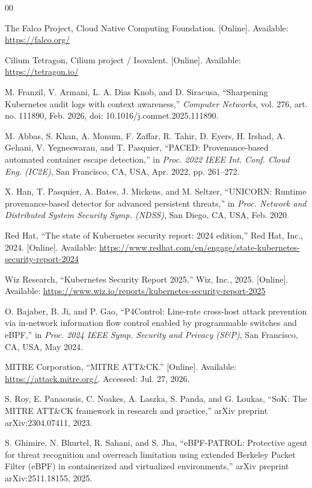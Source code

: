 \documentclass{ieeeaccess}
\begin{document}
\begin{thebibliography}{00}

 The Falco Project, Cloud Native Computing Foundation. [Online]. Available: \url{https://falco.org/}

 Cilium Tetragon, Cilium project / Isovalent. [Online]. Available: \url{https://tetragon.io/}

 M. Franzil, V. Armani, L. A. Dias Knob, and D. Siracusa, ``Sharpening
Kubernetes audit logs with context awareness,'' \emph{Computer Networks}, vol.
276, art. no. 111890, Feb. 2026, doi: 10.1016/j.comnet.2025.111890.

 M. Abbas, S. Khan, A. Monum, F. Zaffar, R. Tahir, D. Eyers, H.
Irshad, A. Gehani, V. Yegneswaran, and T. Pasquier, ``PACED:
Provenance-based automated container escape detection,'' in \emph{Proc. 2022
IEEE Int. Conf. Cloud Eng. (IC2E)}, San Francisco, CA, USA, Apr. 2022,
pp. 261--272.

 X. Han, T. Pasquier, A. Bates, J. Mickens, and M. Seltzer, ``UNICORN:
Runtime provenance-based detector for advanced persistent threats,'' in
\emph{Proc. Network and Distributed System Security Symp. (NDSS)}, San Diego,
CA, USA, Feb. 2020.

 Red Hat, ``The state of Kubernetes security report: 2024 edition,''
Red Hat, Inc., 2024. [Online]. Available: \url{https://www.redhat.com/en/engage/state-kubernetes-security-report-2024}

 Wiz Research, ``Kubernetes Security Report 2025,'' Wiz, Inc., 2025.
[Online]. Available: \url{https://www.wiz.io/reports/kubernetes-security-report-2025}

 O. Bajaber, B. Ji, and P. Gao, ``P4Control: Line-rate cross-host
attack prevention via in-network information flow control enabled by
programmable switches and eBPF,'' in \emph{Proc. 2024 IEEE Symp. Security and
Privacy (S\&P)}, San Francisco, CA, USA, May 2024.

 MITRE Corporation, ``MITRE ATT\&CK.'' [Online]. Available:
\url{https://attack.mitre.org/}. Accessed: Jul. 27, 2026.

 S. Roy, E. Panaousis, C. Noakes, A. Laszka, S. Panda, and G.
Loukas, ``SoK: The MITRE ATT\&CK framework in research and practice,''
arXiv preprint arXiv:2304.07411, 2023.

 S. Ghimire, N. Bhurtel, R. Sahani, and S. Jha, ``eBPF-PATROL:
Protective agent for threat recognition and overreach limitation using
extended Berkeley Packet Filter (eBPF) in containerized and virtualized
environments,'' arXiv preprint arXiv:2511.18155, 2025.


\end{thebibliography}
\end{document}
